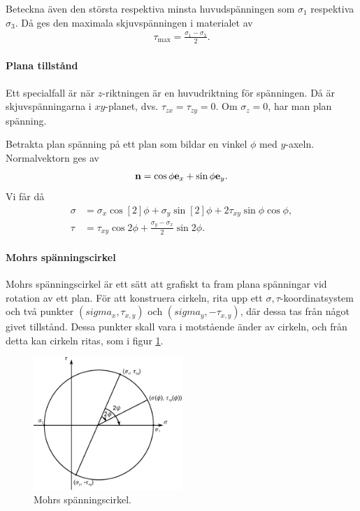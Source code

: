 Beteckna även den största respektiva minsta huvudspänningen som $\sigma_{1}$ respektiva $\sigma_{3}$. Då ges den maximala skjuvspänningen i materialet av
\begin{align*}
	\tau_{\text{max}} = \frac{\sigma_{1} - \sigma_{3}}{2}.
\end{align*}

\paragraph{Plana tillstånd}
Ett specialfall är när $z$-riktningen är en huvudriktning för spänningen. Då är skjuvspänningarna i $xy$-planet, dvs. $\tau_{zx} = \tau_{zy} = 0$. Om $\sigma_{z} = 0$, har man plan spänning.

Betrakta plan spänning på ett plan som bildar en vinkel $\phi$ med $y$-axeln. Normalvektorn ges av
\begin{align*}
	\vb{n} = \cos{\phi}\vb{e}_{x} + \sin{\phi}\vb{e}_{y}.
\end{align*}
Vi får då
\begin{align*}
	\sigma &= \sigma_{x}\cos[2]{\phi} + \sigma_{y}\sin[2]{\phi} + 2\tau_{xy}\sin{\phi}\cos{\phi}, \\
	\tau   &= \tau_{xy}\cos{2\phi} + \frac{\sigma_{y} - \sigma_{x}}{2}\sin{2\phi}.
\end{align*}

\paragraph{Mohrs spänningscirkel}
Mohrs spänningscirkel är ett sätt att grafiskt ta fram plana spänningar vid rotation av ett plan. För att konstruera cirkeln, rita upp ett $\sigma, \tau$-koordinatsystem och två punkter $(sigma_{x}, \tau_{x, y})$ och $(sigma_{y}, -\tau_{x, y})$, där dessa tas från något givet tillstånd. Dessa punkter skall vara i motstående änder av cirkeln, och från detta kan cirkeln ritas, som i figur \ref{fig:mohr_stress_circle}.

\begin{figure}[!ht]
	\centering
	\includegraphics[width = 0.5\textwidth]{./Images/mohr_stress_circle.eps}
	\caption{Mohrs spänningscirkel.}
	\label{fig:mohr_stress_circle}
\end{figure}

